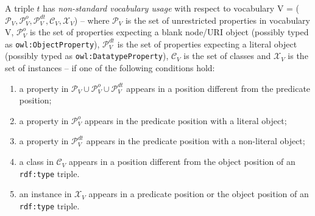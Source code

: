 \documentclass{llncs}
\newcommand{\CV}{\ensuremath{\mathcal{C}_{V}}\xspace}
\newcommand{\PdtV}{\ensuremath{\mathcal{P}_{V}^{dt}}\xspace}
\newcommand{\PoV}{\ensuremath{\mathcal{P}_{V}^{o}}\xspace}
\newcommand{\PV}{\ensuremath{\mathcal{P}_{V}}\xspace}
\newcommand{\XV}{\ensuremath{\mathcal{X}_{V}}\xspace}
\begin{document}
\begin{definition} \label{def:tbox}
A triple $t$ has \emph{non-standard vocabulary usage} with respect to vocabulary V = ($\PV,\PoV,\PdtV,\CV,\XV$) -- where $\PV$ is the set of unrestricted properties in vocabulary V, $\PoV$ is the set of properties expecting a blank node/URI object (possibly typed as {\tt owl:ObjectProperty}), $\PdtV$ is the set of properties expecting a literal object (possibly typed as {\tt owl:DatatypeProperty}), $\CV$ is the set of classes and $\XV$ is the set of instances -- if one of the following conditions hold: 
\begin{enumerate}
\item a property in $\PV \cup \PoV \cup \PdtV$  appears in a position different from the predicate position;
\item a property in $\PoV$ appears in the predicate position with a literal object;
\item a property in $\PdtV$ appears in the predicate position with a non-literal object;
\item a class in $\CV$ appears in a position different from the object position 
of an \texttt{rdf:type} triple.
\item an instance in $\XV$ appears in a predicate position or the object position of an \texttt{rdf:type} triple.
\end{enumerate}
\end{definition}
\end{document}
